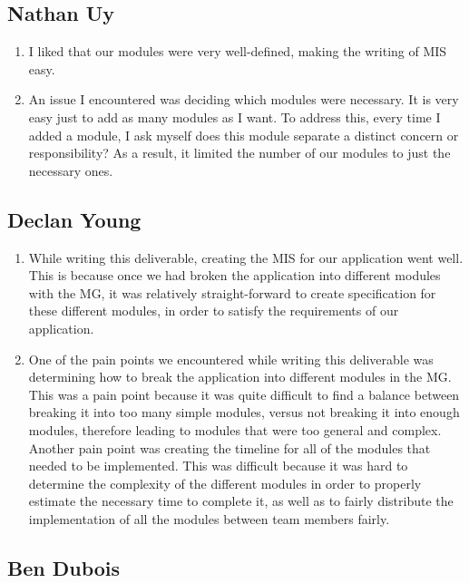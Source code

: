 \documentclass[12pt, titlepage]{article}
\begin{document}
\subsection*{Nathan Uy}

\begin{enumerate}
    \item I liked that our modules were very well-defined, making the writing of MIS easy.
    \item An issue I encountered was deciding which modules were necessary. It is very easy just to add as many modules as I want. To address this, every time I added a module, I ask myself does this module separate a distinct concern or responsibility? As a result, it limited the number of our modules to just the necessary ones.
\end{enumerate}

\subsection*{Declan Young}

\begin{enumerate}
    \item While writing this deliverable, creating the MIS for our application went well. This is because once we had broken the application into different modules with the MG, it was relatively straight-forward to create specification for these different modules, in order to satisfy the requirements of our application. 
    \item One of the pain points we encountered while writing this deliverable was determining how to break the application into different modules in the MG. This was a pain point because it was quite difficult to find a balance between breaking it into too many simple modules, versus not breaking it into enough modules, therefore leading to modules that were too general and complex. Another pain point was creating the timeline for all of the modules that needed to be implemented. This was difficult because it was hard to determine the complexity of the different modules in order to properly estimate the necessary time to complete it, as well as to fairly distribute the implementation of all the modules between team members fairly.
\end{enumerate}

\subsection*{Ben Dubois}
\end{document}
